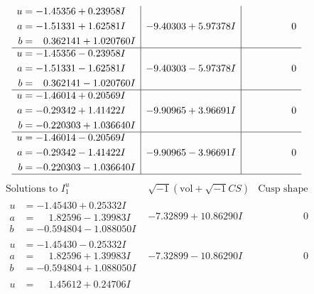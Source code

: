 \documentclass[1p]{elsarticle_modified}
\theoremstyle{definition}
\newcommand{\I}{\sqrt{-1}}
\begin{document}
$$\begin{array}{c|c|c}
\begin{aligned}
u &= -1.45356 + 0.23958 I \\
a &= -1.51331 + 1.62581 I \\
b &= \phantom{-}0.362141 + 1.020760 I\end{aligned}
 & -9.40303 + 5.97378 I & \phantom{-0.000000 } 0 \\ \hline\begin{aligned}
u &= -1.45356 - 0.23958 I \\
a &= -1.51331 - 1.62581 I \\
b &= \phantom{-}0.362141 - 1.020760 I\end{aligned}
 & -9.40303 - 5.97378 I & \phantom{-0.000000 } 0 \\ \hline\begin{aligned}
u &= -1.46014 + 0.20569 I \\
a &= -0.29342 + 1.41422 I \\
b &= -0.220303 + 1.036640 I\end{aligned}
 & -9.90965 + 3.96691 I & \phantom{-0.000000 } 0 \\ \hline\begin{aligned}
u &= -1.46014 - 0.20569 I \\
a &= -0.29342 - 1.41422 I \\
b &= -0.220303 - 1.036640 I\end{aligned}
 & -9.90965 - 3.96691 I & \phantom{-0.000000 } 0\\
 \hline 
 \end{array}$$\newpage$$\begin{array}{c|c|c}  
\text{Solutions to }I^u_{1}& \I (\text{vol} + \sqrt{-1}CS) & \text{Cusp shape}\\
 \hline 
\begin{aligned}
u &= -1.45430 + 0.25332 I \\
a &= \phantom{-}1.82596 - 1.39983 I \\
b &= -0.594804 - 1.088050 I\end{aligned}
 & -7.32899 + 10.86290 I & \phantom{-0.000000 } 0 \\ \hline\begin{aligned}
u &= -1.45430 - 0.25332 I \\
a &= \phantom{-}1.82596 + 1.39983 I \\
b &= -0.594804 + 1.088050 I\end{aligned}
 & -7.32899 - 10.86290 I & \phantom{-0.000000 } 0 \\ \hline\begin{aligned}
u &= \phantom{-}1.45612 + 0.24706 I \\

\end{aligned}
\end{array}$$
\end{document}
